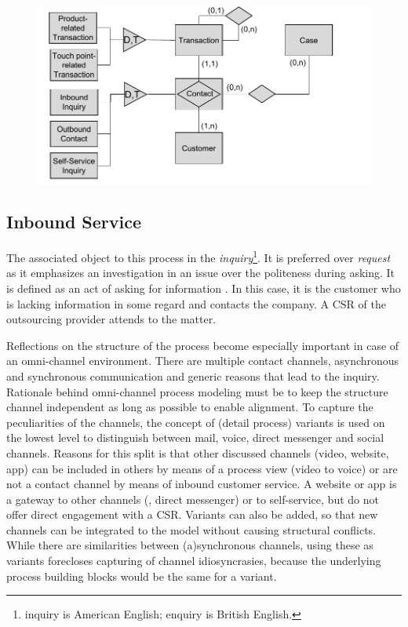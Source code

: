 	 \begin{figure}[caption={\acrshort{ERM} of Customer-facing Services}, label={fig:contacterm}]
	 	{	\includegraphics[width=.8\textwidth]{figures/contacterm.pdf}}
	 \end{figure} 
	 
	 
	 
	 \subsection{Inbound Service}
	 \label{pr:inb}
	 The associated object to this process in the \textit{inquiry}\footnote{inquiry is American English; enquiry is British English.}. It is preferred over \textit{request} as it emphasizes an investigation in an issue over the politeness during asking. It is defined as an act of asking for information \citep{oxfordenquiry, oxfordrequest}. In this case, it is the customer who is lacking information in some regard and contacts the company. A \acrshort{CSR} of the outsourcing provider attends to the matter. 
	 
	 Reflections on the structure of the process become especially important in case of an omni-channel environment. There are multiple contact channels, asynchronous and synchronous communication and generic reasons that lead to the inquiry. Rationale behind omni-channel process modeling must be to keep the structure channel independent as long as possible to enable alignment. To capture the peculiarities of the channels, the concept of (detail process) variants is used on the lowest level to distinguish between mail, voice, direct messenger and social channels. Reasons for this split is that other discussed channels (video, website, app) can be included in others by means of a process view (video to voice) or are not a contact channel by means of inbound customer service. A website or app is a gateway to other channels (\eg, direct messenger) or to self-service, but do not offer direct engagement with a \acrshort{CSR}. Variants can also be added, so that new channels can be integrated to the model without causing structural conflicts. While there are similarities between (a)synchronous channels, using these as variants forecloses capturing of channel idiosyncrasies, because the underlying process building blocks would be the same for a variant. 
	 

